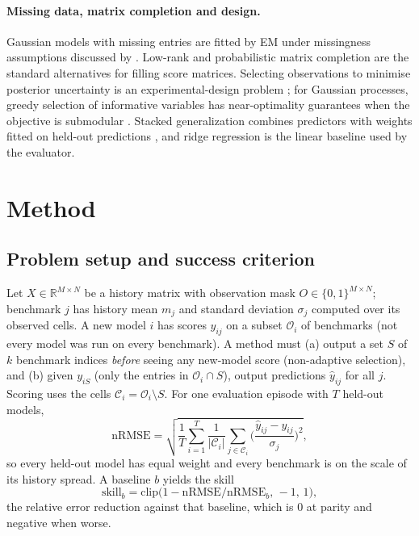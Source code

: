 \documentclass{article}
\newcommand{\nrmse}{\mathrm{nRMSE}}
\begin{document}
\paragraph{Missing data, matrix completion and design.} Gaussian models with missing entries are fitted by EM \citep{Dempster1977EM} under missingness assumptions discussed by \citet{Rubin1976Inference}. Low-rank and probabilistic matrix completion \citep{Candes2009MatrixCompletion,Salakhutdinov2007PMF} are the standard alternatives for filling score matrices. Selecting observations to minimise posterior uncertainty is an experimental-design problem \citep{Chaloner1995BayesianDesign}; for Gaussian processes, greedy selection of informative variables has near-optimality guarantees when the objective is submodular \citep{Nemhauser1978Submodular,Krause2008NearOptimalSensor}. Stacked generalization combines predictors with weights fitted on held-out predictions \citep{Wolpert1992Stacked,Breiman1996Stacked}, and ridge regression \citep{Hoerl1970Ridge} is the linear baseline used by the evaluator.

\section{Method}\label{sec:method}

\subsection{Problem setup and success criterion}\label{sec:setup}
Let $X\in\mathbb{R}^{M\times N}$ be a history matrix with observation mask $O\in\{0,1\}^{M\times N}$; benchmark $j$ has history mean $m_j$ and standard deviation $\sigma_j$ computed over its observed cells. A new model $i$ has scores $y_{ij}$ on a subset $\mathcal{O}_i$ of benchmarks (not every model was run on every benchmark). A method must (a) output a set $S$ of $k$ benchmark indices \emph{before} seeing any new-model score (non-adaptive selection), and (b) given $y_{iS}$ (only the entries in $\mathcal{O}_i\cap S$), output predictions $\hat y_{ij}$ for all $j$. Scoring uses the cells $\mathcal{C}_i=\mathcal{O}_i\setminus S$. For one evaluation episode with $T$ held-out models,
\begin{equation}
\nrmse=\sqrt{\frac1T\sum_{i=1}^{T}\frac{1}{|\mathcal{C}_i|}\sum_{j\in\mathcal{C}_i}\Big(\frac{\hat y_{ij}-y_{ij}}{\sigma_j}\Big)^2},
\end{equation}
so every held-out model has equal weight and every benchmark is on the scale of its history spread. A baseline $b$ yields the skill
\begin{equation}
\mathrm{skill}_b = \mathrm{clip}\big(1-\nrmse/\nrmse_b,\,-1,\,1\big),
\end{equation}
the relative error reduction against that baseline, which is $0$ at parity and negative when worse.
\end{document}

